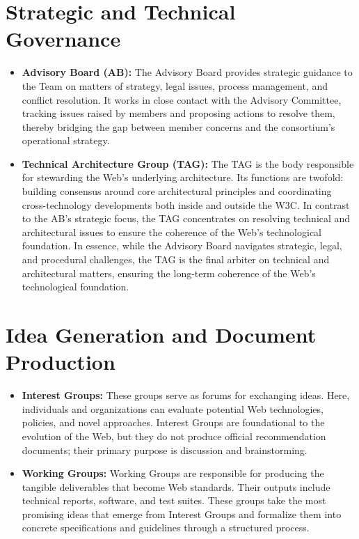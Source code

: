 \documentclass{scrbook}
\begin{document}
\section{Strategic and Technical Governance}

\begin{itemize}
    \item 
    \textbf{Advisory Board (AB):} The Advisory Board provides strategic guidance to the Team on matters of strategy, legal issues, process management, and conflict resolution. It works in close contact with the Advisory Committee, tracking issues raised by members and proposing actions to resolve them, thereby bridging the gap between member concerns and the consortium's operational strategy.

    \item 
    \textbf{Technical Architecture Group (TAG):} The TAG is the body responsible for stewarding the Web's underlying architecture. Its functions are twofold: building consensus around core architectural principles and coordinating cross-technology developments both inside and outside the W3C. In contrast to the AB's strategic focus, the TAG concentrates on resolving technical and architectural issues to ensure the coherence of the Web's technological foundation. In essence, while the Advisory Board navigates strategic, legal, and procedural challenges, the TAG is the final arbiter on technical and architectural matters, ensuring the long-term coherence of the Web's technological foundation.
\end{itemize}

\section{Idea Generation and Document Production}

\begin{itemize}
    \item 
    \textbf{Interest Groups:} These groups serve as forums for exchanging ideas. Here, individuals and organizations can evaluate potential Web technologies, policies, and novel approaches. Interest Groups are foundational to the evolution of the Web, but they do not produce official recommendation documents; their primary purpose is discussion and brainstorming.

    \item 
    \textbf{Working Groups:} Working Groups are responsible for producing the tangible deliverables that become Web standards. Their outputs include technical reports, software, and test suites. These groups take the most promising ideas that emerge from Interest Groups and formalize them into concrete specifications and guidelines through a structured process.
\end{itemize}
\end{document}
